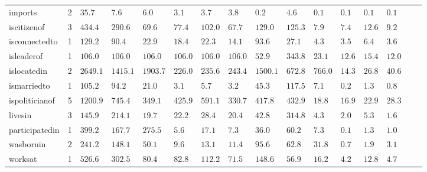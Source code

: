 \begin{tabular}{lr|lllllll|lllllll}
       imports &    2 &       $35.7$ &    $7.6$ &        $6.0$ &   $\bm{3.1}$ &           $3.7$ &           $3.8$ &    $0.2$ &   $4.6$ &   $0.1$ &  $\bm{0.1}$ &           $0.1$ &           $0.1$ \\
   iscitizenof &    3 &      $434.4$ &  $290.6$ &  $\bm{69.6}$ &       $77.4$ &         $102.0$ &          $67.7$ &  $129.0$ & $125.3$ &   $7.9$ &  $\bm{7.4}$ &          $12.6$ &           $9.2$ \\
 isconnectedto &    1 &      $129.2$ &   $90.4$ &       $22.9$ &  $\bm{18.4}$ &          $22.3$ &          $14.1$ &   $93.6$ &  $27.1$ &   $4.3$ &  $\bm{3.5}$ &           $6.4$ &           $3.6$ \\
    isleaderof &    1 & $\bm{106.0}$ &  $106.0$ &      $106.0$ &      $106.0$ &         $106.0$ &         $106.0$ &   $52.9$ & $343.8$ &  $23.1$ & $\bm{12.6}$ &          $15.4$ &          $12.0$ \\
   islocatedin &    2 &     $2649.1$ & $1415.1$ &     $1903.7$ & $\bm{226.0}$ &         $235.6$ &         $243.4$ & $1500.1$ & $672.8$ & $766.0$ & $\bm{14.3}$ &          $26.8$ &          $40.6$ \\
   ismarriedto &    1 &      $105.2$ &   $94.2$ &       $21.0$ &   $\bm{3.1}$ &           $5.7$ &           $3.2$ &   $45.3$ & $117.5$ &   $7.1$ &  $\bm{0.2}$ &           $1.3$ &           $0.8$ \\
ispoliticianof &    5 &     $1200.9$ &  $745.4$ & $\bm{349.1}$ &      $425.9$ &         $591.1$ &         $330.7$ &  $417.8$ & $432.9$ &  $18.8$ & $\bm{16.9}$ &          $22.9$ &          $28.3$ \\
       livesin &    3 &      $145.9$ &  $214.1$ &  $\bm{19.7}$ &       $22.2$ &          $28.4$ &          $20.4$ &   $42.8$ & $314.8$ &   $4.3$ &  $\bm{2.0}$ &           $5.3$ &           $1.6$ \\
participatedin &    1 &      $399.2$ &  $167.7$ &      $275.5$ &   $\bm{5.6}$ &          $17.1$ &           $7.3$ &   $36.0$ &  $60.2$ &   $7.3$ &  $\bm{0.1}$ &           $1.3$ &           $1.0$ \\
     wasbornin &    2 &      $241.2$ &  $148.1$ &       $50.1$ &   $\bm{9.6}$ &          $13.1$ &          $11.4$ &   $95.6$ &  $62.8$ &  $31.8$ &  $\bm{0.7}$ &           $1.9$ &           $3.1$ \\
       worksat &    1 &      $526.6$ &  $302.5$ &  $\bm{80.4}$ &       $82.8$ &         $112.2$ &          $71.5$ &  $148.6$ &  $56.9$ &  $16.2$ &  $\bm{4.2}$ &          $12.8$ &           $4.7$ \\
\bottomrule
\end{tabular}
